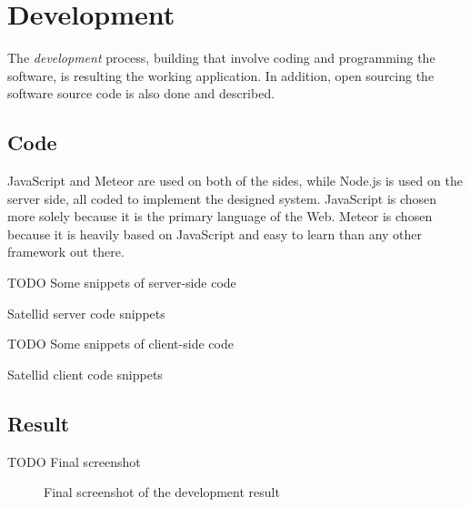 \section{Development}
\label{sec:development}

The \textit{development} process, building that involve coding and programming the software, is resulting the working application.
In addition, open sourcing the software source code is also done and described.

\subsection{Code}

JavaScript and Meteor are used on both of the sides, while Node.js is used on the server side, all coded to implement the designed system.
JavaScript is chosen more solely because it is the primary language of the Web.
Meteor is chosen because it is heavily based on JavaScript and easy to learn than any other framework out there.

TODO Some snippets of server-side code

\begin{listing}[htbp]
  \caption{Satellid server code snippets}
  \label{lst:satellid-code-server}
\end{listing}

TODO Some snippets of client-side code

\begin{listing}[htbp]
  \caption{Satellid client code snippets}
  \label{lst:satellid-code-client}
\end{listing}

\subsection{Result}

TODO Final screenshot

\begin{figure}[htb]
  \centering
  \caption{Final screenshot of the development result}
  \label{fig:satellid-result}
\end{figure}

